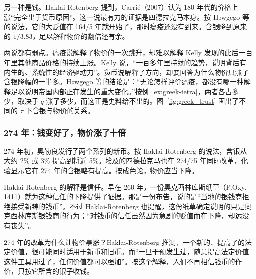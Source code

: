 另一种是钱。Haklai-Rotenberg 提到，Carrié（2007）认为 180 年代的价格上涨“完全出于货币原因”\cite{haklai2011}。这一说最有力的证据是四德拉克马本身。按 Howgego 等的说法，它的大贬值在 164/5 年就开始了，那时瘟疫还没有到来。含银降到原来的 $1/3.83$，足以解释物价的翻倍还有余。

两说都有弱点。瘟疫说解释了物价的一次跳升，却难以解释 Kelly 发现的此后一百年里其他商品价格的持续上涨。Kelly 说，“一百多年里持续的趋势，说明背后有内生的、系统性的经济驱动力”\cite{kelly2021}。货币说解释了方向，却要回答为什么物价只涨了含银降幅的一半多。Howgego 等的结论是：“无论怎样评价瘟疫，都没有哪一种解释足以说明帝国内部正在发生的重大变化。”\cite{howgego2010}按例~\ref{ex:greek-tetra}，两者各占多少，取决于 $q$ 涨了多少，而这正是史料给不出的。图~\ref{fig:greek_trust} 画出了不同的 $\tau$ 下含银与物价的关系。


\subsubsection{274 年：钱变好了，物价涨了十倍}
274 年初，奥勒良发行了两个系列的新币。按 Haklai-Rotenberg 的说法，含银从大约 2\% 或 3\% 提高到将近 5\%\cite{haklai2011}。埃及的四德拉克马也在 274/75 年同时改革，化验显示它在 274 年的含银略有提高\cite{haklai2011}。按成色论，物价应当下降。

Haklai-Rotenberg 的解释是信任。早在 260 年，一份奥克西林库斯纸草（P.Oxy. 1411）就为这种信任的下降提供了证据。那是一份布告，说的是“当地的银钱商拒绝接受新铸的钱币”\cite{haklai2011}。不过 Haklai-Rotenberg 也提醒，这份纸草确定说明的只是奥克西林库斯银钱商的行为；“对钱币的信任虽然因为急剧的贬值而在下降，却远没有丧失”\cite{haklai2011}。

274 年的改革为什么让物价暴涨？Haklai-Rotenberg 推测，一个新的、提高了的法定价值，很可能同时适用于新币和旧币。而“一旦干预发生过，随意提高法定价值这件工具用过了，任何价值都可以强加”\cite{haklai2011}。按这个解释，人们不再相信钱币的作价，只按它所含的银子收钱。

